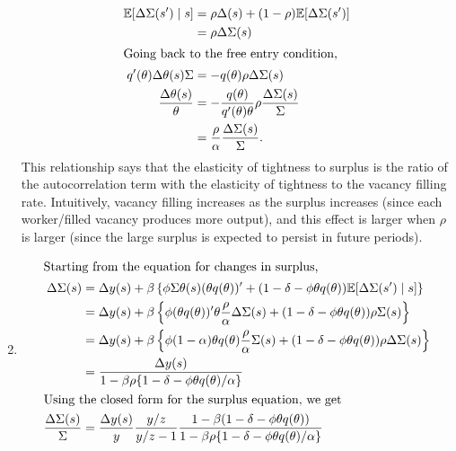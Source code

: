 \documentclass[11pt]{article}
\newcommand{\E}{\mathbb{E}}
\begin{document}
\begin{enumerate}[label=\alph*)]
\begin{align*}
\E[\Delta \Sigma (s') \mid s] &= \rho \Delta (s) + (1 - \rho)\E[\Delta \Sigma (s')]\\
&= \rho \Delta \Sigma (s)\\
\intertext{Going back to the free entry condition, }
q'(\theta) \Delta \theta (s) \Sigma &= - q (\theta) \rho \Delta \Sigma (s)\\
\frac{\Delta \theta (s)}{\theta} &= - \frac{q(\theta)}{q'(\theta) \theta} \rho \frac{\Delta \Sigma (s)}{\Sigma}\\
&= \frac{\rho}{\alpha} \frac{\Delta \Sigma (s)}{\Sigma}.
\end{align*}
This relationship says that the elasticity of tightness to surplus is the ratio of the autocorrelation term with the elasticity of tightness to the vacancy filling rate. Intuitively, vacancy filling increases as the surplus increases (since each worker/filled vacancy produces more output), and this effect is larger when $\rho$ is larger (since the large surplus is expected to persist in future periods).
\item
\begin{align*}
\intertext{Starting from the equation for changes in surplus,}
\Delta \Sigma(s) &= \Delta y(s) + \beta \left\{\phi \Sigma \theta (s) (\theta q (\theta))' + (1 - \delta - \phi \theta q(\theta))\E[\Delta \Sigma (s') \mid s]\right\}\\
&= \Delta y(s) + \beta \left\{\phi (\theta q (\theta))' \theta \frac{\rho}{\alpha} \Delta \Sigma (s) + (1 - \delta - \phi \theta q(\theta)) \rho \Sigma (s)\right\}\\
&= \Delta y(s) + \beta \left\{\phi (1 - \alpha) \theta q(\theta) \frac{\rho}{\alpha} \Sigma (s) + (1 - \delta - \phi \theta q (\theta))\rho \Delta \Sigma(s)\right\}\\
&= \frac{\Delta y(s)}{1 - \beta \rho\{1 - \delta - \phi \theta q(\theta)/\alpha\}}\\
\intertext{Using the closed form for the surplus equation, we get}
\frac{\Delta \Sigma (s)}{\Sigma} &= \frac{\Delta y(s)}{y} \frac{y/z}{y/z - 1} \frac{1 - \beta (1 - \delta - \phi \theta q (\theta))}{1 - \beta \rho \{1 - \delta - \phi \theta q(\theta) / \alpha\}}
\end{align*}
\end{enumerate}

\newpage
\end{document}
